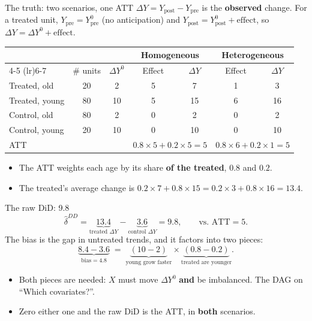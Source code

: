 \documentclass[
  11pt,
  ignorenonframetext,
  aspectratio=169,
]{beamer}
\providecommand{\tightlist}{%
  \setlength{\itemsep}{0pt}\setlength{\parskip}{0pt}}
\begin{document}
\begin{frame}{The truth: two scenarios, one ATT}
\protect{}\label{the-truth-two-scenarios-one-att}
\(\Delta Y = Y_{\text{post}} - Y_{\text{pre}}\) is the \textbf{observed}
change. For a treated unit, \(Y_{\text{pre}} = Y^0_{\text{pre}}\) (no
anticipation) and
\(Y_{\text{post}} = Y^0_{\text{post}} + \text{effect}\), so
\(\Delta Y = \Delta Y^0 + \text{effect}.\)

\begin{center}\small
\begin{tabular}{lcccccc}
\toprule
 & & & \multicolumn{2}{c}{Homogeneous} & \multicolumn{2}{c}{Heterogeneous} \\
\cmidrule(lr){4-5} \cmidrule(lr){6-7}
 & \# units & $\Delta Y^0$ & Effect & $\Delta Y$ & Effect & $\Delta Y$ \\
\midrule
Treated, old & 20 & 2 & 5 & 7 & 1 & 3 \\
Treated, young & 80 & 10 & 5 & 15 & 6 & 16 \\
\addlinespace
Control, old & 80 & 2 & 0 & 2 & 0 & 2 \\
Control, young & 20 & 10 & 0 & 10 & 0 & 10 \\
\midrule
ATT & & & \multicolumn{2}{c}{$0.8 \times 5 + 0.2 \times 5 = 5$} & \multicolumn{2}{c}{$0.8 \times 6 + 0.2 \times 1 = 5$} \\
\bottomrule
\end{tabular}
\end{center}

\begin{itemize}
\tightlist
\item
  The ATT weights each age by its share \textbf{of the treated}, \(0.8\)
  and \(0.2\).
\item
  The treated's average change is
  \(0.2 \times 7 + 0.8 \times 15 = 0.2 \times 3 + 0.8 \times 16 = 13.4\).
\end{itemize}
\end{frame}

\begin{frame}{The raw DiD: 9.8}
\protect{}\label{the-raw-did-9.8}
\[
\hat\delta^{DD} = \underbrace{13.4}_{\text{treated } \Delta Y} - \underbrace{3.6}_{\text{control } \Delta Y} = 9.8, \qquad \text{vs. ATT} = 5 .
\] The bias is the gap in untreated trends, and it factors into two
pieces: \[
\underbrace{8.4 - 3.6}_{\text{bias} = 4.8} \;=\; \underbrace{(10 - 2)}_{\text{young grow faster}} \times \underbrace{(0.8 - 0.2)}_{\text{treated are younger}} .
\]

\begin{itemize}
\tightlist
\item
  Both pieces are needed: \(X\) must move \(\Delta Y^0\) \textbf{and} be
  imbalanced. The DAG on ``Which covariates?''.
\item
  Zero either one and the raw DiD is the ATT, in \textbf{both}
  scenarios.
\end{itemize}
\end{frame}
\end{document}
